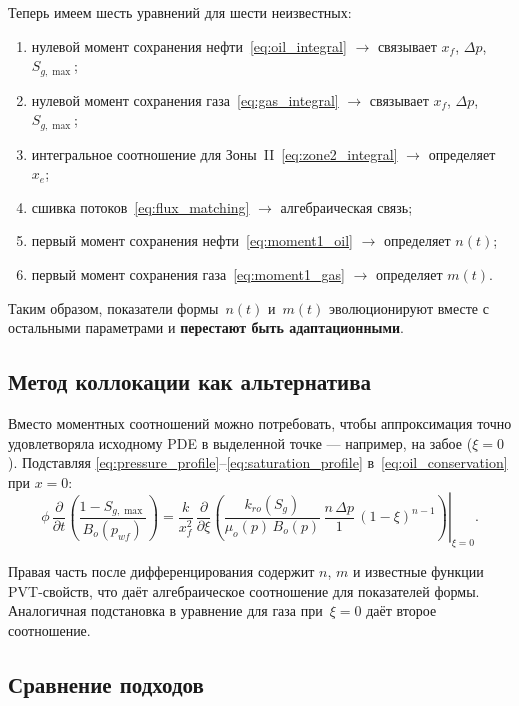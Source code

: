 \documentclass[12pt,a4paper]{article}
\begin{document}
Теперь имеем шесть уравнений для шести неизвестных:
\begin{enumerate}
  \item нулевой момент сохранения нефти~\eqref{eq:oil_integral}
        $\longrightarrow$ связывает $x_f$, $\Delta p$, $S_{g,\max}$;
  \item нулевой момент сохранения газа~\eqref{eq:gas_integral}
        $\longrightarrow$ связывает $x_f$, $\Delta p$, $S_{g,\max}$;
  \item интегральное соотношение для Зоны~II~\eqref{eq:zone2_integral}
        $\longrightarrow$ определяет $x_e$;
  \item сшивка потоков~\eqref{eq:flux_matching}
        $\longrightarrow$ алгебраическая связь;
  \item первый момент сохранения нефти~\eqref{eq:moment1_oil}
        $\longrightarrow$ определяет $n(t)$;
  \item первый момент сохранения газа~\eqref{eq:moment1_gas}
        $\longrightarrow$ определяет $m(t)$.
\end{enumerate}

Таким образом, показатели формы~$n(t)$ и~$m(t)$ эволюционируют
вместе с остальными параметрами и \textbf{перестают быть
адаптационными}.

\subsection{Метод коллокации как альтернатива}

Вместо моментных соотношений можно потребовать, чтобы аппроксимация
точно удовлетворяла исходному PDE в выделенной точке --- например,
на забое ($\xi = 0$). Подставляя
\eqref{eq:pressure_profile}--\eqref{eq:saturation_profile}
в~\eqref{eq:oil_conservation} при $x = 0$:
\begin{equation}\label{eq:collocation_oil}
  \phi\,\frac{\partial}{\partial t}
  \left(\frac{1-S_{g,\max}}{B_o(p_{wf})}\right)
  = \frac{k}{x_f^2}\,\frac{\partial}{\partial\xi}
  \left.\left(
    \frac{k_{ro}(S_g)}{\mu_o(p)\,B_o(p)}\,
    \frac{n\,\Delta p}{1}\,(1-\xi)^{n-1}
  \right)\right|_{\xi=0}.
\end{equation}

Правая часть после дифференцирования содержит $n$, $m$ и известные
функции PVT-свойств, что даёт алгебраическое соотношение для
показателей формы. Аналогичная подстановка в уравнение для газа
при~$\xi = 0$ даёт второе соотношение.

\subsection{Сравнение подходов}
\end{document}
